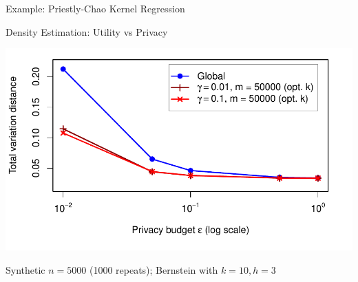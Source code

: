 \documentclass{beamer}
\begin{document}
\begin{frame}{Example: Priestly-Chao Kernel Regression}
\end{frame}

\begin{frame}{Density Estimation: Utility vs Privacy}
	\vspace{1em}
	\begin{center}
		\includegraphics[width=1\textwidth]{figures/KDE_utility_vs_privacy}
	\end{center}
	\vspace{-1em}
	Synthetic $n=5000$ (1000 repeats); Bernstein with $k=10, h=3$%
\end{frame}
\end{document}
